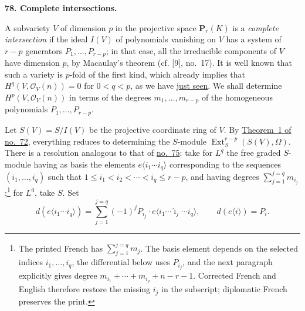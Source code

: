 
\medskip
{}\label{fac:III:5:no:78}
\textbf{78. Complete intersections.}

\label{fac:III:5:no:78:def:complete-intersection}
A subvariety $V$ of dimension $p$ in the projective space
$\mathbf P_r(K)$ is a \textit{complete intersection} if the ideal
$I(V)$ of polynomials vanishing on $V$ has a system of $r-p$ generators
\label{fac:III:5:no:78:external-citation:Macaulay-theorem}
$P_1,\ldots,P_{r-p}$; in that case, all the irreducible components of
$V$ have dimension $p$, by Macaulay's theorem (cf. [9], no.~17). It is
well known that such a variety is $p$-fold of the first kind, which
already implies that $H^q(V,\mathcal O_V(n))=0$ for $0<q<p$, as we have
\hyperref[fac:III:5:no:77:prop:3:ii]{just seen}. We shall determine $H^p(V,\mathcal O_V(n))$ in terms of the
degrees $m_1,\ldots,m_{r-p}$ of the homogeneous polynomials
$P_1,\ldots,P_{r-p}$.

Let $S(V)=S/I(V)$ be the projective coordinate ring of $V$. By
\hyperref[fac:III:4:no:72:thm:1]{Theorem~1 of no.~72}, everything
reduces to determining the $S$-module
$\operatorname{Ext}_S^{r-p}(S(V),\Omega)$. There is a resolution
analogous to that of
\hyperref[fac:III:5:no:75:formula:resolution]{no.~75}: take for $L^q$
the free graded $S$-module having as basis the elements
$e\langle i_1\cdots i_q\rangle$ corresponding to the sequences
$(i_1,\ldots,i_q)$ such that
$1\leq i_1<i_2<\cdots<i_q\leq r-p$, and having degrees
\label{fac:III:5:no:78:def:Lq}
$\sum_{j=1}^{j=q}m_{i_j}$;\footnote{The printed French has
$\sum_{j=1}^{j=q}m_j$. The basis element depends on the selected indices
$i_1,\ldots,i_q$, the differential below uses $P_{i_j}$, and the next
paragraph explicitly gives degree
$m_{i_1}+\cdots+m_{i_q}+n-r-1$. Corrected French and English therefore
restore the missing $i_j$ in the subscript; diplomatic French preserves
the print.} for $L^0$, take $S$. Set
\label{fac:III:5:no:78:formula:differential}
\[
d(e\langle i_1\cdots i_q\rangle)
=\sum_{j=1}^{j=q}(-1)^jP_{i_j}\cdot
e\langle i_1\cdots\widehat{\imath}_j\cdots i_q\rangle,
\qquad
d(e\langle i\rangle)=P_i.
\]

